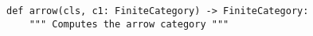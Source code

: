 \begin{verbatim}
def arrow(cls, c1: FiniteCategory) -> FiniteCategory:
    """ Computes the arrow category """
\end{verbatim}